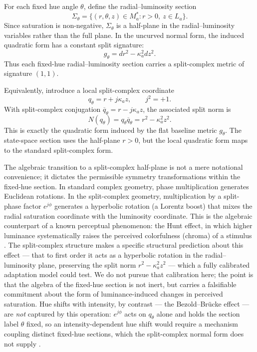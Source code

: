 \documentclass[preprint,12pt,authoryear]{elsarticle}
\theoremstyle{plain}
\theoremstyle{definition}
\theoremstyle{remark}
\begin{document}
\noindent For each fixed hue angle $\theta$, define the radial--luminosity section
\[
\Sigma_{\theta}=\{(r,\theta,z)\in M_a^{\ast}: r>0,\ z\in L_a\}.
\]
Since saturation is non-negative, $\Sigma_{\theta}$ is a half-plane in the radial--luminosity variables rather than the full plane. In the uncurved normal form, the induced quadratic form has a constant split signature:
\[
g_{\theta}=dr^{2}-\kappa_a^{2}dz^{2}.
\]
Thus each fixed-hue radial--luminosity section carries a split-complex metric of signature $(1,1)$.

Equivalently, introduce a local split-complex coordinate
\[
q_{\theta}=r+j\kappa_a z,
\qquad
j^{2}=+1.
\]
With split-complex conjugation $\overline q_{\theta}=r-j\kappa_a z$, the associated split norm is
\[
N(q_{\theta})=q_{\theta}\overline q_{\theta}=r^{2}-\kappa_a^{2}z^{2}.
\]
This is exactly the quadratic form induced by the flat baseline metric $g_{\theta}$. The state-space section uses the half-plane $r>0$, but the local quadratic form maps to the standard split-complex form.

The algebraic transition to a split-complex half-plane is not a mere notational convenience; it dictates the permissible symmetry transformations within the fixed-hue section. In standard complex geometry, phase multiplication generates Euclidean rotations. In the split-complex geometry, multiplication by a split-phase factor $e^{j\phi}$ generates a hyperbolic rotation (a Lorentz boost) that mixes the radial saturation coordinate with the luminosity coordinate. This is the algebraic counterpart of a known perceptual phenomenon: the Hunt effect, in which higher luminance systematically raises the perceived colorfulness (chroma) of a stimulus \citep{Hunt1952,Fairchild2013}. The split-complex structure makes a specific structural prediction about this effect --- that to first order it acts as a hyperbolic rotation in the radial--luminosity plane, preserving the split norm $r^2-\kappa_a^2 z^2$ --- which a fully calibrated adaptation model could test. We do not pursue that calibration here; the point is that the algebra of the fixed-hue section is not inert, but carries a falsifiable commitment about the form of luminance-induced changes in perceived saturation. Hue shifts with intensity, by contrast --- the Bezold--Brücke effect --- are \emph{not} captured by this operation: $e^{j\phi}$ acts on $q_\theta$ alone and holds the section label $\theta$ fixed, so an intensity-dependent hue shift would require a mechanism coupling distinct fixed-hue sections, which the split-complex normal form does not supply \citep{Purdy1931}.
\end{document}
